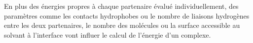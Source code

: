 En plus des énergies propres à chaque partenaire évalué individuellement, des paramètres comme les contacts hydrophobes ou le nombre de liaisons hydrogènes entre les deux partenaires, le nombre des molécules ou la surface accessible au solvant à l'interface vont influer le calcul de l'énergie d'un complexe. 




